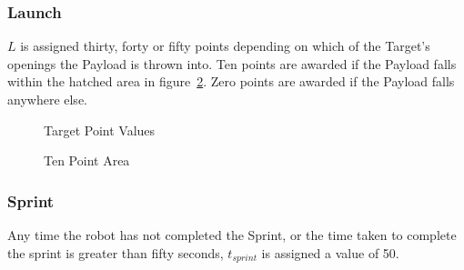 \subsubsection{Launch}
$L$ is assigned thirty, forty or fifty points depending on which of the Target’s openings the Payload is thrown into. Ten points are awarded if the Payload falls within the hatched area in figure~\ref{fig:10pts_zone}. Zero points are awarded if the Payload falls anywhere else.

\begin{figure}[H]
	\centering
	\caption{Target Point Values}
	\label{fig:target} 
\end{figure}

\begin{figure}[H]
	\centering
	\caption{Ten Point Area}
	\label{fig:10pts_zone} 
\end{figure}

\subsubsection{Sprint}
Any time the robot has not completed the Sprint, or the time taken to complete the sprint is greater than fifty seconds, $t_{sprint}$ is assigned a value of 50. 

